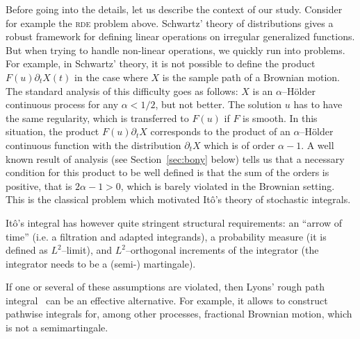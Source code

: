 \documentclass[11pt,a4paper]{article}
\newcommand{\mathd}{\mathrm{d}}
\theoremstyle{remark}
\begin{document}
Before going into the details, let us describe the context of our study. Consider for example the \textsc{rde} problem above. 
Schwartz' theory of distributions gives a robust framework for defining linear operations on irregular generalized functions. But when trying to handle non-linear operations, we quickly run into problems. For example, in Schwartz' theory, it is not possible to define the product $F(u) \partial_t X(t)$ in the case where $X$ is the sample path of a Brownian motion. The standard analysis of this difficulty goes as follows: $X$ is an $\alpha$--H\"older continuous process for any $\alpha<1/2$, but not better. The solution $u$ has to have the same regularity, which is transferred to $F(u)$ if $F$ is smooth. In this situation, the product $F(u)\partial_t X$ corresponds to the product of an $\alpha$--H\"older continuous function with the distribution $\partial_t X$ which is of order $\alpha-1$. A well known result of analysis (see Section~\ref{sec:bony} below) tells us that a necessary condition for this product to be well defined is that the sum of the orders is positive, that is $2\alpha-1>0$, which is barely violated in the Brownian setting.
This is the classical problem which motivated It\^o's theory of stochastic integrals.

It\^{o}'s integral has however quite stringent structural requirements: an ``arrow of time'' (i.e. a filtration and adapted integrands), a probability measure (it is defined as $L^2$--limit), and $L^2$--orthogonal increments of the integrator (the integrator needs to be a (semi-) martingale).

If one or several of these assumptions are violated, then Lyons' rough path integral~\cite{Lyons1998, Lyons2002, Lyons2007, Friz2010} can be an effective alternative. For example, it allows to construct pathwise  integrals for, among other processes, fractional Brownian motion, which is not a semimartingale. 
\end{document}

